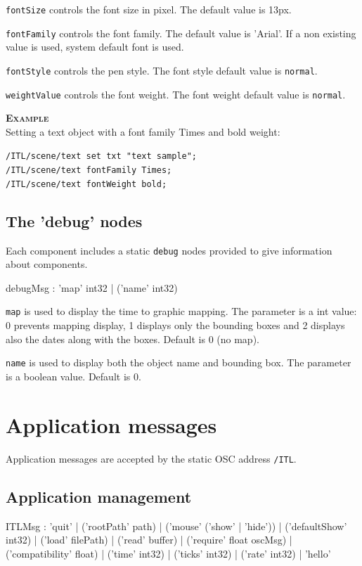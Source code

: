 \documentclass[a4paper,twoside]{report}
\newcommand{\toplevel}[1]	{\chapter{#1}}
\newcommand{\sublevel}[1]	{\section{#1}}
\newcommand{\OSC}[1]		{\texttt{#1}}
\newcommand{\example}		{\textbf{\hspace{-1.5cm}\textbf{\textsc{Example }}}}
\let\olditemize\itemize
\let\oldenditemize\enditemize
\renewenvironment{itemize} 	{\olditemize \setlength{\itemsep}{1mm}}{\oldenditemize}
\newcommand{\sample}	[1]			{\vspace{-2mm}\begin{center}\colorbox{mygrey}{
								\begin{minipage}[t]{0.9\columnwidth} 
								{\small \texttt{#1}}
								\end{minipage}}\end{center}}
\begin{document}
\begin{itemize}
\item \OSC{fontSize} controls the font size in pixel. The default value is 13px.
\item \OSC{fontFamily} controls the font family. The default value is 'Arial'. If a non existing value is used, system default font is used.
\item \OSC{fontStyle} controls the pen style. The font style default value is \OSC{normal}.\\
\item \OSC{weightValue} controls the font weight. The font weight default value is \OSC{normal}.
\end{itemize}

\example \\
Setting a text object with a font family Times and bold weight:
\sample{/ITL/scene/text set txt "text sample";\\
/ITL/scene/text fontFamily Times;\\
/ITL/scene/text fontWeight bold;  
}


\sublevel{The 'debug' nodes}
\label{debugnode}

Each component includes a static \OSC{debug} nodes provided to give information about components.
\begin{rail}
debugMsg : 'map' int32
		| ('name' int32) 
\end{rail}

\begin{itemize}
\item \OSC{map} is used to display the time to graphic mapping. The parameter is a int value: 0 prevents mapping display, 1 displays only the bounding boxes and 2 displays also the dates along with the boxes. Default is 0 (no map).
\item \OSC{name} is used to display both the object name and bounding box. The parameter is a boolean value. Default is 0.
\end{itemize}


\toplevel{Application messages}
\label{ITL}
Application messages are accepted by the static OSC address \OSC{/ITL}. 


\sublevel{Application management}
\label{applmgmt}

\begin{rail}
ITLMsg : 'quit' 
		| ('rootPath' path) 
		| ('mouse' ('show' | 'hide'))
		| ('defaultShow' int32)
		| ('load' filePath)
		| ('read' buffer)
		| ('require' float oscMsg)
		| ('compatibility' float)
		| ('time' int32)
		| ('ticks' int32)
		| ('rate' int32)
		| 'hello'
\end{rail}
\end{document}

